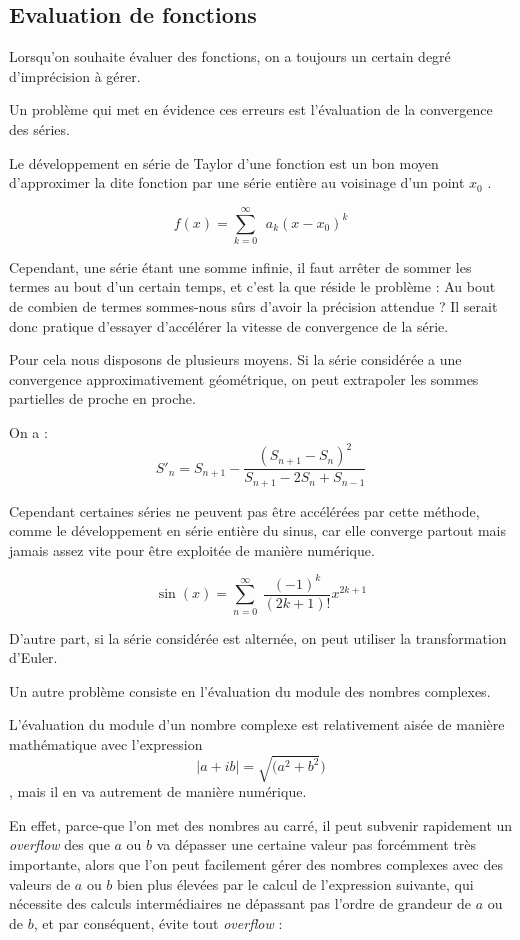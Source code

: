 \documentclass{article}
\begin{document}
\subsection{Evaluation de fonctions}
Lorsqu'on souhaite évaluer des fonctions, on a toujours un certain degré d'imprécision à gérer.

Un problème qui met en évidence ces erreurs est l'évaluation de la convergence des séries.

Le développement en série de Taylor d’une fonction est un bon moyen d’approximer la dite fonction par une série entière au voisinage d’un point $x_0$ .

\[f(x)=\sum_{k=0}^\infty~\ a_k(x-x_0)^k\]

Cependant, une série étant une somme infinie, il faut arrêter de sommer les termes au bout d’un certain temps, et c’est la que réside le problème : Au bout de combien de termes  sommes-nous sûrs d'avoir la précision attendue ? Il serait donc pratique d’essayer d’accélérer la vitesse de convergence de la série.

Pour cela nous disposons de plusieurs moyens. Si la série considérée a une convergence approximativement géométrique, on peut extrapoler les sommes partielles de proche en proche.

On a :
\begin{equation}
S'_n = S_{n+1} - \frac{(S_{n+1} - S_n)^2}{S_{n+1} -2S_n + S_{n-1}}
\end{equation}

Cependant certaines séries ne peuvent pas être accélérées par cette méthode, comme le développement en série entière du sinus, car elle converge partout mais jamais assez vite pour être exploitée de manière numérique.

\[\sin(x)=\sum_{n=0}^\infty~\frac{(-1)^k}{(2k+1)!} x^{2k+1}\]

D'autre part, si la série considérée est alternée, on peut utiliser la transformation d'Euler.

Un autre problème consiste en l'évaluation du module des nombres complexes.

L'évaluation du module d’un nombre complexe est relativement aisée de manière mathématique avec l’expression \[|a + ib| = \sqrt{(a^2 + b^2})\], mais il en va autrement de manière numérique.

En effet, parce-que l'on met des nombres au carré, il peut subvenir rapidement un \textit{overflow} des que $a$ ou $b$ va dépasser une certaine valeur pas forcémment très importante, alors que l'on peut facilement gérer des nombres complexes avec des valeurs de $a$ ou $b$ bien plus élevées par le calcul de l'expression suivante, qui nécessite des calculs intermédiaires ne dépassant pas l'ordre de grandeur de $a$ ou de $b$, et par conséquent, évite tout \textit{overflow} :
\end{document}
